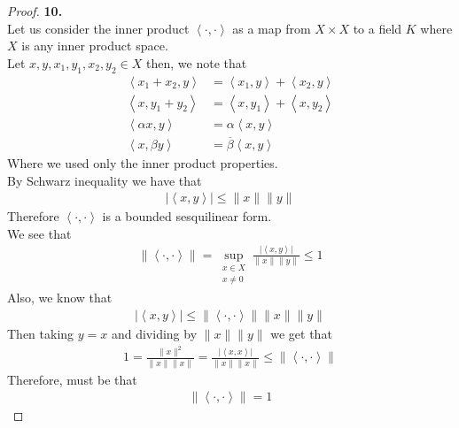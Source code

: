 \documentclass[11pt]{article}
\newcommand{\inprd}[1]{\left\langle{#1}\right\rangle}
\theoremstyle{definition}
\begin{document}
\cleardoublepage
\begin{proof}{\textbf{10.}}\\
Let us consider the inner product $\inprd{\cdot, \cdot}$ as a map from 
$X\times X$ to a field $K$ where $X$ is any inner product space. \\
Let $x, y, x_1, y_1, x_2, y_2 \in X$ then, we note that
\begin{align*}
    \inprd{x_1 + x_2, y} &= \inprd{x_1, y} + \inprd{x_2, y} \\
    \inprd{x, y_1 + y_2} &= \inprd{x, y_1} + \inprd{x, y_2} \\
    \inprd{\alpha x, y} &= \alpha\inprd{x, y} \\
    \inprd{x, \beta y} &= \overline{\beta}\inprd{x, y}
\end{align*}
Where we used only the inner product properties.\\
By Schwarz inequality we have that
\begin{align*}
    |\inprd{x,y}| \leq \|x\|\|y\|
\end{align*}
Therefore $\inprd{\cdot, \cdot}$ is a bounded sesquilinear form. \\
We see that
\begin{align*}
    \|\inprd{\cdot, \cdot}\|
    = \sup_{\substack{x \in X\\ x \neq 0}} \frac{|\inprd{x,y}|}{\|x\|\|y\|}
    \leq 1
\end{align*}
Also, we know that
\begin{align*}
    |\inprd{x,y}| \leq \|\inprd{\cdot, \cdot}\| \|x\|\|y\|
\end{align*}
Then taking $y = x$ and dividing by $\|x\|\|y\|$ we get that
\begin{align*}
    1 = \frac{\|x\|^2}{\|x\|\|x\|} 
    = \frac{|\inprd{x,x}|}{\|x\|\|x\|} \leq \|\inprd{\cdot, \cdot}\| 
\end{align*}
Therefore, must be that
\begin{align*}
    \|\inprd{\cdot, \cdot}\| = 1
\end{align*}
\end{proof}
\end{document}
